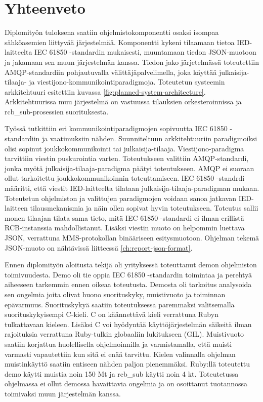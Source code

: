 \chapter{Yhteenveto}
\label{ch:yhteenveto}
Diplomityön tuloksena saatiin ohjelmistokomponentti osaksi isompaa sähköasemien liittyvää järjestelmää. Komponentti kykeni tilaamaan tietoa IED-laitteelta IEC 61850 -stan\-dar\-din mukaisesti, muuntamaan tiedon JSON-muotoon ja jakamaan sen muun järjestelmän kanssa. Tiedon jako järjetelmässä toteutettiin AMQP-standardiin pohjautuvalla välittäjäpalvelimella, joka käyttää julkaisija-tilaaja- ja viestijono-kommunikointiparadigmoja. Toteutetun systeemin arkkitehtuuri esitettiin kuvassa \ref{fig:planned-system-architecture}. Arkkitehtuurissa muu järjestelmä on vastuussa tilauksien orkesteroinnissa ja rcb\_sub-prosessien suorituksesta.

Työssä tutkittiin eri kommunikointiparadigmojen sopivuutta IEC 61850 -standardiin ja vaatimuksiin nähden. Suunniteltuun arkkitehtuuriin paradigmoiksi olisi sopinut joukkokommunikointi tai julkaisija-tilaaja. Viestijono-paradigma tarvittiin viestin puskurointia varten. Toteutukseen valittiin AMQP-standardi, jonka myötä julkaisija-tilaaja-paradigma päätyi toteutukseen. AMQP ei suoraan ollut tarkoitettu joukkokommunikoinnin toteuttamiseen. IEC 61850 -standrdi määritti, että viestit IED-laitteelta tilataan julkaisija-tilaaja-paradigman mukaan. Toteutetun ohjelmiston ja valittujen paradigmojen voidaan sanoa jatkavan IED-laitteen tilausmekanismia ja näin ollen sopivat hyvin toteutukseen. Toteutus sallii monen tilaajan tilata sama tieto, mitä IEC 61850 -standardi ei ilman erillistä RCB-instanssia mahdollistanut. Lisäksi viestin muoto on helpommin luettava JSON, verrattuna MMS-protokollan binääriseen esitysmuotoon. Ohjelman tekemä JSON-muoto on nähtävissä liitteessä \ref{ch:report-json-format}.

Ennen diplomityön aloitusta tekijä oli yrityksessä toteuttanut demon ohjelmiston toimivuudesta. Demo oli tie oppia IEC 61850 -standardin toimintaa ja perehtyä aiheeseen tarkemmin ennen oikeaa toteutusta. Demosta oli tarkoitus analysoida sen ongelmia joita olivat huono suorituskyky, muistivuoto ja toiminnan epävarmuus. Suorituskykyä saatiin toteutuksessa paremmaksi valitsemalla suorituskykyisempi C-kieli. C on käännettävä kieli verrattuna Rubyn tulkattavaan kieleen. Lisäksi C voi hyödyntää käyttöjärjestelmän säikeitä ilman rajoituksia verrattuna Ruby-tulkin globaaliin lukitukseen (GIL). Muistivuoto saatiin korjattua huolellisella ohjelmoinnilla ja varmistamalla, että muisti varmasti vapautettiin kun sitä ei enää tarvittu. Kielen valinnalla ohjelman muistinkäyttö saatiin entiseen nähden paljon pienemmäksi. Ruby:llä toteutettu demo käytti muistia noin 150 Mt ja rcb\_sub käytti noin 4 kt. Toteutetussa ohjelmassa ei ollut demossa havaittavia ongelmia ja on osoittanut tuotannossa toimivaksi muun järjestelmän kanssa.


